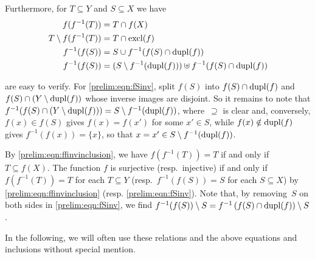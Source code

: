 Furthermore, for $T \subseteq Y$ and $S \subseteq X$ we have
\begingroup
\allowdisplaybreaks 
\begin{align}
	f(f^{-1}(T)) & = T \cap f(X) \label{prelim:eqn:ffinvinclusion} \\
	T \setminus f(f^{-1}(T)) & = T \cap \operatorname{excl}(f)	\label{prelim:eqn:exclA} \\
	f^{-1}(f(S)) & = S \cup f^{-1}(f(S) \cap \operatorname{dupl}(f)) \label{prelim:eqn:finvfinclusion} \\
	f^{-1}(f(S)) & = ( S \setminus f^{-1}(\operatorname{dupl}(f)) ) \uplus f^{-1}(f(S) \cap \operatorname{dupl}(f)) \label{prelim:eqn:fSinv}
\end{align} 
\endgroup%

are easy to verify.
For \cref{prelim:eqn:fSinv}, split $f(S)$ into $f(S) \cap \operatorname{dupl}(f)$ and
$f(S) \cap ( Y \setminus \operatorname{dupl}(f) )$ whose inverse images are
disjoint. So it remains to note that
$f^{-1}(f(S) \cap ( Y \setminus \operatorname{dupl}(f) )) = S \setminus f^{-1}(\operatorname{dupl}(f))$,
where~$\supseteq$ is clear and, conversely, $f(x) \in f(S)$ gives $f(x) = f(x')$
for some $x' \in S$, while $f(x) \notin \operatorname{dupl}(f)$ gives $f^{-1}(f(x)) = \{x\}$,
so that $x = x' \in S \setminus f^{-1}(\operatorname{dupl}(f))$.

By \cref{prelim:eqn:ffinvinclusion}, we have
$f(f^{-1}(T)) = T$ if and only if $T \subseteq f(X)$.
The function $f$ is surjective (resp.~injective)
if and only if $f(f^{-1}(T)) = T$ 
for each $T \subseteq Y$ (resp.~$f^{-1}(f(S)) = S$ for each $S \subseteq X$)
by \cref{prelim:eqn:ffinvinclusion} (resp. \cref{prelim:eqn:fSinv}).
Note that, by removing~$S$ on both sides in \cref{prelim:eqn:fSinv}, we find 
$f^{-1}(f(S)) \setminus S = f^{-1}\left( f(S) \cap \operatorname{dupl}(f) \right) \setminus S$.

In the following, we will often use these relations and the above equations and inclusions without special mention.

